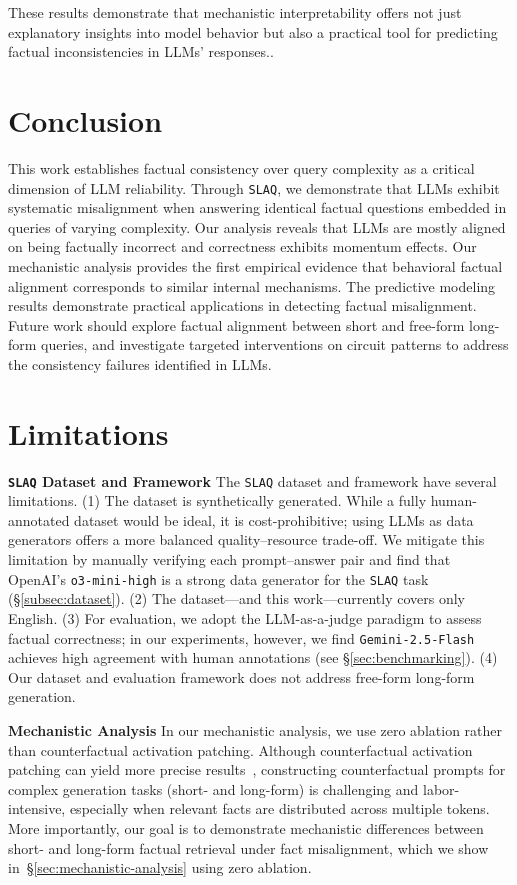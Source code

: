 \documentclass[11pt]{article}
\newcommand{\rparagraph}[1]{\vspace{1.2mm}\noindent\textbf{#1}}
\newcommand{\acrnm}{\texttt{SLAQ}\xspace}
\begin{document}
These results demonstrate that mechanistic interpretability offers not just explanatory insights into model behavior but also a practical tool for predicting factual inconsistencies in LLMs' responses..


\section{Conclusion}

This work establishes factual consistency over query complexity as a critical dimension of LLM reliability. Through \acrnm, we demonstrate that LLMs exhibit systematic misalignment when answering identical factual questions embedded in queries of varying complexity. Our analysis reveals that LLMs are mostly aligned on being factually incorrect and correctness exhibits momentum effects. Our mechanistic analysis provides the first empirical evidence that behavioral factual alignment corresponds to similar internal mechanisms. The predictive modeling results demonstrate practical applications in detecting factual misalignment. Future work should explore factual alignment between short and free-form long-form queries, and investigate targeted interventions on circuit patterns to address the consistency failures identified in LLMs. 

\section*{Limitations}

\rparagraph{\acrnm Dataset and Framework} 
The \acrnm dataset and framework have several limitations. 
(1) The dataset is synthetically generated. While a fully human-annotated dataset would be ideal, it is cost-prohibitive; using LLMs as data generators offers a more balanced quality–resource trade-off. We mitigate this limitation by manually verifying each prompt–answer pair and find that OpenAI’s \texttt{o3-mini-high} is a strong data generator for the \acrnm task (\S\ref{subsec:dataset}). (2) The dataset—and this work—currently covers only English. (3) For evaluation, we adopt the LLM-as-a-judge paradigm to assess factual correctness; in our experiments, however, we find \texttt{Gemini-2.5-Flash} achieves high agreement with human annotations (see \S\ref{sec:benchmarking}). (4) Our dataset and evaluation framework does not address free-form long-form generation.


\rparagraph{Mechanistic Analysis} 
In our mechanistic analysis, we use zero ablation rather than counterfactual activation patching. Although counterfactual activation patching can yield more precise results~\cite{zhangtowards, heimersheim2024use}, constructing counterfactual prompts for complex generation tasks (short- and long-form) is challenging and labor-intensive, especially when relevant facts are distributed across multiple tokens. More importantly, our goal is to demonstrate mechanistic differences between short- and long-form factual retrieval under fact misalignment, which we show in~\S\ref{sec:mechanistic-analysis} using zero ablation.
\end{document}
